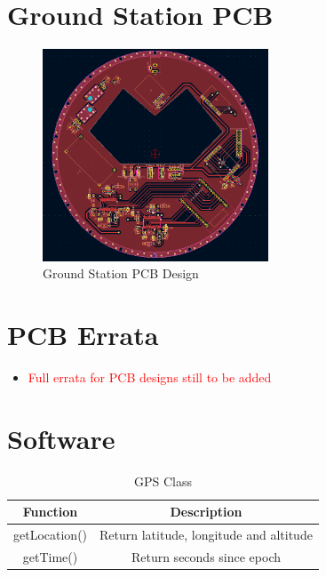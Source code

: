 

\section{Ground Station PCB}\label{sec:appendix_gs_pcb_design}
\begin{figure}[!htb]
  \centering
  \includegraphics[width=0.6\textwidth]{gs_pcb_design}
  \caption{Ground Station PCB Design}
  \label{fig:gs_pcb}
\end{figure}
\section{PCB Errata}\label{sec:appendix_pcb_errata}
\begin{itemize}
    \item \textcolor{red}{Full errata for PCB designs still to be added}
\end{itemize}
\section{Software}
\begin{table}[!htb]
  \centering
  \caption{GPS Class}
  \renewcommand{\arraystretch}{1.2}
  \begin{tabular}{ |c|c| }
  \hline
  \textbf{Function}        & \textbf{Description}    \\
  \hline
    getLocation()              & Return latitude, longitude and altitude \\
    getTime()                  & Return seconds since epoch \\
  \hline
  \end{tabular}
  \label{tab:gpsUML}
\end{table}

